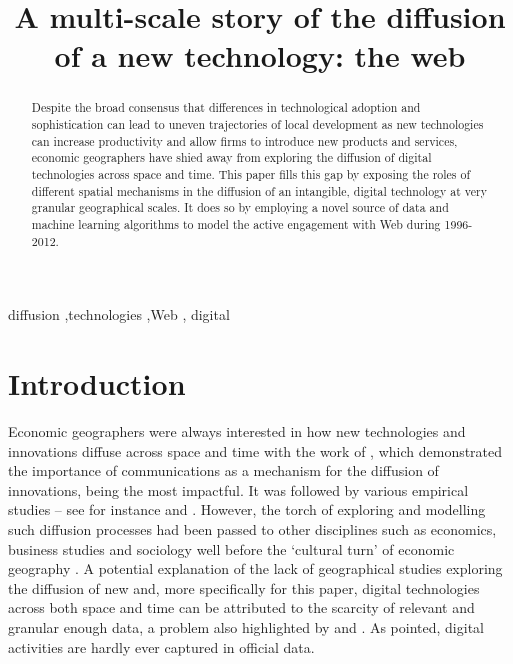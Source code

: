 \documentclass[
  authoryear,
  preprint,
  3p]{elsarticle}
\begin{document}
\begin{frontmatter}
\title{A multi-scale story of the diffusion of a new technology: the
web}


        
\begin{abstract}
Despite the broad consensus that differences in technological adoption
and sophistication can lead to uneven trajectories of local development
as new technologies can increase productivity and allow firms to
introduce new products and services, economic geographers have shied
away from exploring the diffusion of digital technologies across space
and time. This paper fills this gap by exposing the roles of different
spatial mechanisms in the diffusion of an intangible, digital technology
at very granular geographical scales. It does so by employing a novel
source of data and machine learning algorithms to model the active
engagement with Web during 1996-2012.
\end{abstract}





\begin{keyword}
    diffusion \sep technologies \sep Web \sep 
    digital
\end{keyword}
\end{frontmatter}
    

\section{Introduction}\label{sec-introduction}

Economic geographers were always interested in how new technologies and
innovations diffuse across space and time with the work of
\citet{hagerstrand1968innovation}, which demonstrated the importance of
communications as a mechanism for the diffusion of innovations, being
the most impactful. It was followed by various empirical studies -- see
for instance \citet{ormrod1990} and \citet{iso2005}. However, the torch
of exploring and modelling such diffusion processes had been passed to
other disciplines such as economics, business studies and sociology well
before the `cultural turn' of economic geography
\citep{perkins2005international}. A potential explanation of the lack of
geographical studies exploring the diffusion of new and, more
specifically for this paper, digital technologies across both space and
time can be attributed to the scarcity of relevant and granular enough
data, a problem also highlighted by \citet{iso2005} and
\citet{kemeny2011international}. As \citet{zook2022mapping} pointed,
digital activities are hardly ever captured in official data.
\end{document}
